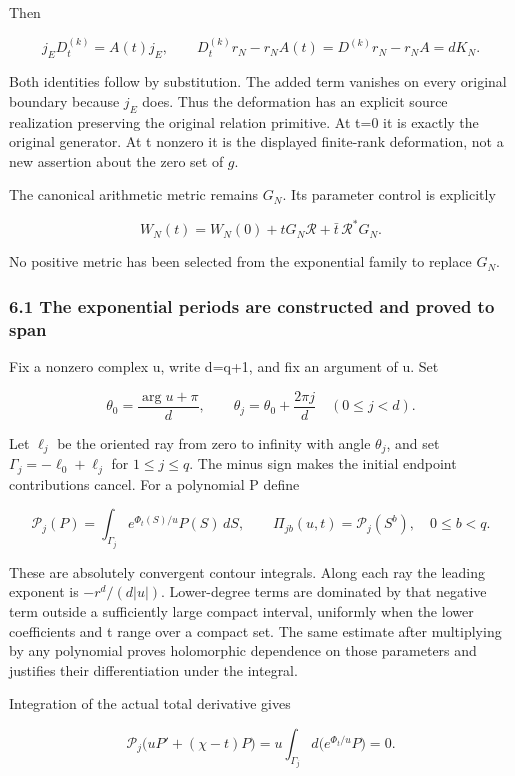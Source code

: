 \documentclass[
  11pt,
]{article}
\begin{document}
Then

\[
j_ED_t^{(k)}=A(t)j_E,
\qquad
\boxed{D_t^{(k)}r_N-r_NA(t)=D^{(k)}r_N-r_NA=dK_N.}
\tag{35}
\]

Both identities follow by substitution. The added term vanishes on every
original boundary because \(j_E\) does. Thus the deformation has an
explicit source realization preserving the original relation primitive.
At t=0 it is exactly the original generator. At t nonzero it is the
displayed finite-rank deformation, not a new assertion about the zero
set of \(g\).

The canonical arithmetic metric remains \(G_N\). Its parameter control
is explicitly

\[
\boxed{W_N(t)=W_N(0)+tG_N\mathcal R+\bar t\,\mathcal R^*G_N.}
\tag{36}
\]

No positive metric has been selected from the exponential family to
replace \(G_N\).

\subsubsection{6.1 The exponential periods are constructed and proved to
span}\label{the-exponential-periods-are-constructed-and-proved-to-span}

Fix a nonzero complex u, write d=q+1, and fix an argument of u. Set

\[
\theta_0=\frac{\arg u+\pi}{d},\qquad
\theta_j=\theta_0+\frac{2\pi j}{d}\quad(0\le j<d).
\tag{36a}
\]

Let \(\ell_j\) be the oriented ray from zero to infinity with angle
\(\theta_j\), and set \(\Gamma_j=-\ell_0+\ell_j\) for \(1\le j\le q\).
The minus sign makes the initial endpoint contributions cancel. For a
polynomial P define

\[
\mathcal P_j(P)=\int_{\Gamma_j}e^{\Phi_t(S)/u}P(S)\,dS,
\qquad
\Pi_{jb}(u,t)=\mathcal P_j(S^b),\quad 0\le b<q.
\tag{36b}
\]

These are absolutely convergent contour integrals. Along each ray the
leading exponent is \(-r^d/(d|u|)\). Lower-degree terms are dominated by
that negative term outside a sufficiently large compact interval,
uniformly when the lower coefficients and t range over a compact set.
The same estimate after multiplying by any polynomial proves holomorphic
dependence on those parameters and justifies their differentiation under
the integral.

Integration of the actual total derivative gives

\[
\mathcal P_j\bigl(uP'+(\chi-t)P\bigr)
=u\int_{\Gamma_j}d\bigl(e^{\Phi_t/u}P\bigr)=0.
\tag{36c}
\]
\end{document}
